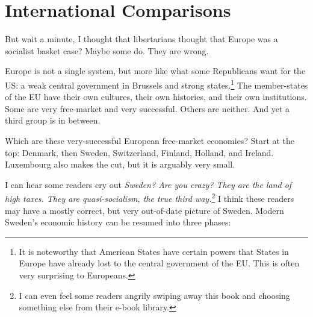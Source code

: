 \chapter{International Comparisons}\label{chpt:international}

But wait a minute, I thought that libertarians thought that Europe was a
socialist basket case? Maybe some do. They are wrong.

Europe is not a single system, but more like what some Republicans want for the
US: a weak central government in Brussels and strong states.\footnote{It is
noteworthy that American States have certain powers that States in Europe have
already lost to the central government of the EU. This is often very surprising
to Europeans.} The member-states of the EU have their own cultures, their own
histories, and their own institutions. Some are very free-market and very
successful. Others are neither. And yet a third group is in between.

Which are these very-successful European free-market economies? Start at the
top: Denmark, then Sweden, Switzerland, Finland, Holland, and Ireland.
Luxembourg also makes the cut, but it is arguably very small.

I can hear some readers cry out \emph{Sweden? Are you crazy? They are the land
of high taxes. They are quasi-socialism, the true third way.}\footnote{I can
even feel some readers angrily swiping away this book and choosing something
else from their e-book library.} I think these readers may have a mostly
correct, but very out-of-date picture of Sweden. Modern Sweden's economic
history can be resumed into three phases:

